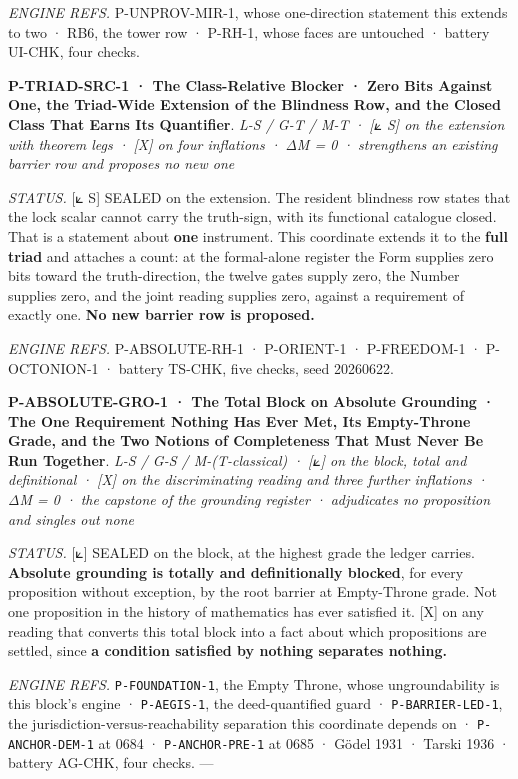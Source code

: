\documentclass[10pt,twocolumn]{article}
\begin{document}
\emph{ENGINE REFS.} P-UNPROV-MIR-1, whose one-direction statement this
extends to two · RB6, the tower row · P-RH-1, whose faces are untouched
· battery UI-CHK, four checks.

\textbf{P-TRIAD-SRC-1 · The Class-Relative Blocker · Zero Bits Against
One, the Triad-Wide Extension of the Blindness Row, and the Closed Class
That Earns Its Quantifier}. \emph{L-S / G-T / M-T · {[}⟀ S{]} on the
extension with theorem legs · {[}X{]} on four inflations · ΔM = 0 ·
strengthens an existing barrier row and proposes no new one}

\emph{STATUS.} {[}⟀ S{]} SEALED on the extension. The resident blindness
row states that the lock scalar cannot carry the truth-sign, with its
functional catalogue closed. That is a statement about \textbf{one}
instrument. This coordinate extends it to the \textbf{full triad} and
attaches a count: at the formal-alone register the Form supplies zero
bits toward the truth-direction, the twelve gates supply zero, the
Number supplies zero, and the joint reading supplies zero, against a
requirement of exactly one. \textbf{No new barrier row is proposed.}

\emph{ENGINE REFS.} P-ABSOLUTE-RH-1 · P-ORIENT-1 · P-FREEDOM-1 ·
P-OCTONION-1 · battery TS-CHK, five checks, seed 20260622.

\textbf{P-ABSOLUTE-GRO-1 · The Total Block on Absolute Grounding · The
One Requirement Nothing Has Ever Met, Its Empty-Throne Grade, and the
Two Notions of Completeness That Must Never Be Run Together}. \emph{L-S
/ G-S / M-(T-classical) · {[}⟀{]} on the block, total and definitional ·
{[}X{]} on the discriminating reading and three further inflations · ΔM
= 0 · the capstone of the grounding register · adjudicates no
proposition and singles out none}

\emph{STATUS.} {[}⟀{]} SEALED on the block, at the highest grade the
ledger carries. \textbf{Absolute grounding is totally and definitionally
blocked}, for every proposition without exception, by the root barrier
at Empty-Throne grade. Not one proposition in the history of mathematics
has ever satisfied it. {[}X{]} on any reading that converts this total
block into a fact about which propositions are settled, since \textbf{a
condition satisfied by nothing separates nothing.}

\emph{ENGINE REFS.} \texttt{P-FOUNDATION-1}, the Empty Throne, whose
ungroundability is this block's engine · \texttt{P-AEGIS-1}, the
deed-quantified guard · \texttt{P-BARRIER-LED-1}, the
jurisdiction-versus-reachability separation this coordinate depends on ·
\texttt{P-ANCHOR-DEM-1} at 0684 · \texttt{P-ANCHOR-PRE-1} at 0685 ·
Gödel 1931 · Tarski 1936 · battery AG-CHK, four checks. ---
\end{document}
